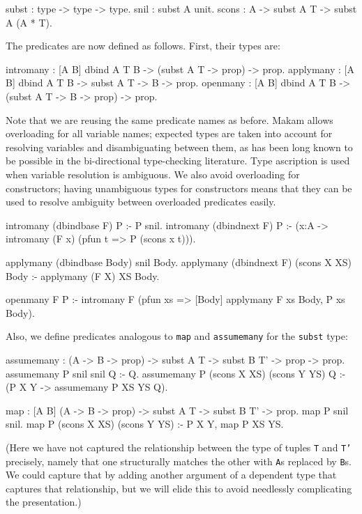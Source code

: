 \documentclass[format=acmlarge,review,anonymous]{acmart}\settopmatter{printfolios=true}
\begin{document}
\begin{codequote}
subst : type -> type -> type.
snil : subst A unit.
scons : A -> subst A T -> subst A (A * T).
\end{codequote}

The predicates are now defined as follows. First, their types are:

\begin{codequote}
intromany : [A B] dbind A T B -> (subst A T -> prop) -> prop.
applymany : [A B] dbind A T B -> subst A T -> B -> prop.
openmany : [A B] dbind A T B -> (subst A T -> B -> prop) -> prop.
\end{codequote}

Note that we are reusing the same predicate names as before. Makam allows overloading for all
variable names; expected types are taken into account for resolving variables and disambiguating
between them, as has been long known to be possible in the bi-directional type-checking
literature. Type ascription is used when variable resolution is ambiguous. We also avoid overloading
for constructors; having unambiguous types for constructors means that they can be used to resolve
ambiguity between overloaded predicates easily.

\begin{codequote}
intromany (dbindbase F) P :- P snil.
intromany (dbindnext F) P :-
  (x:A -> intromany (F x) (pfun t => P (scons x t))).

applymany (dbindbase Body) snil Body.
applymany (dbindnext F) (scons X XS) Body :-
  applymany (F X) XS Body.

openmany F P :-
  intromany F (pfun xs => [Body] applymany F xs Body, P xs Body).
\end{codequote}

Also, we define predicates analogous to \texttt{map} and \texttt{assumemany} for the \texttt{subst}
type:

\begin{codequote}
assumemany : (A -> B -> prop) -> subst A T -> subst B T' -> prop -> prop.
assumemany P snil snil Q :- Q.
assumemany P (scons X XS) (scons Y YS) Q :- (P X Y -> assumemany P XS YS Q).

map : [A B] (A -> B -> prop) -> subst A T -> subst B T' -> prop.
map P snil snil.
map P (scons X XS) (scons Y YS) :- P X Y, map P XS YS.
\end{codequote}

(Here we have not captured the relationship between the type of tuples \texttt{T} and \texttt{T'}
precisely, namely that one structurally matches the other with \texttt{A}s replaced by
\texttt{B}s. We could capture that by adding another argument of a dependent type that captures that
relationship, but we will elide this to avoid needlessly complicating the presentation.)
\end{document}

